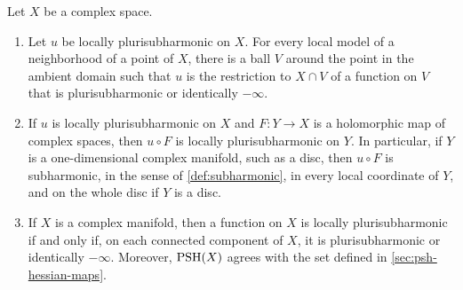 \begin{lemma}\label{lem:psh-reduced-space-basic}
Let $X$ be a complex space.
\begin{enumerate}
\item Let $u$ be locally plurisubharmonic on $X$. For every local model of a neighborhood of a point of $X$, there is a ball $V$ around the point in the ambient domain such that $u$ is the restriction to $X\cap V$ of a function on $V$ that is plurisubharmonic or identically $-\infty$.
\item If $u$ is locally plurisubharmonic on $X$ and $F\colon Y\to X$ is a holomorphic map of complex spaces, then $u\circ F$ is locally plurisubharmonic on $Y$. In particular, if $Y$ is a one-dimensional complex manifold, such as a disc, then $u\circ F$ is subharmonic, in the sense of \cref{def:subharmonic}, in every local coordinate of $Y$, and on the whole disc if $Y$ is a disc.
\item If $X$ is a complex manifold, then a function on $X$ is locally plurisubharmonic if and only if, on each connected component of $X$, it is plurisubharmonic or identically $-\infty$. Moreover, $\mathrm{PSH}(X)$ agrees with the set defined in \cref{sec:psh-hessian-maps}.
\end{enumerate}
\end{lemma}
